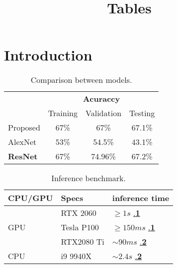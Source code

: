 \documentclass[12pt, onside]{article}
\title{Tables}
\author{}
\date{}
\begin{document}
\maketitle


\newpage
\section{Introduction}


\begin{table}[h]
\begin{center} {
\begin{tabular}{lccc}
\hline 
& \multicolumn{3}{c}{\bf Acuraccy}  \\[0.5 pt]
& \multicolumn{1}{c}{Training} & \multicolumn{1}{c}{Validation} & \multicolumn{1}{c}{Testing}\\
{Proposed} & 67\% & 67\% & 67.1\%\\[1ex]
{AlexNet} & 53\% & 54.5\% & 43.1\%\\[1ex]
{\bf ResNet} & 67\% & 74.96\% & 67.2\% \\[1ex]
\hline 
\end{tabular}}
\end{center}
\caption{Comparison between models.}
\label{tab:com}
\end{table}


\begin{table}[h]
    \centering
\begin{tabular}{ |l|l|l| }
\hline
CPU/GPU & Specs & inference time \\
\hline
\multirow{3}{*}{GPU} 
 & RTX 2060 & $\geq 1s$ \href{https://github.com/facebookresearch/detectron2/issues/308}{.\bf1} \\
 & Tesla P100 & $\geq 150ms$ \href{https://github.com/facebookresearch/detectron2/issues/308}{.\bf1} \\
 & RTX2080 Ti &  $ \sim 90ms$ \href{https://forums.fast.ai/t/object-detection-models-deplyoment-in-real-life/72853}{.\bf2}\\
\hline
\multirow{1}{*}{CPU} 
 & i9 9940X & $\sim 2.4s$ \href{https://forums.fast.ai/t/object-detection-models-deplyoment-in-real-life/72853}{.\bf2} \\
\hline
\end{tabular}
\caption{Inference benchmark.}
\label{tab:inferbench}
\end{table}
\end{document}
